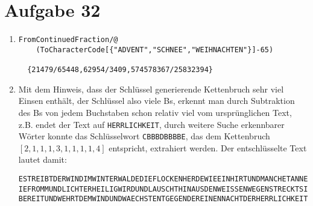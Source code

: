 \section*{Aufgabe 32}
\begin{enumerate}
	\item
	\lstset{language=Mathematica}
	\begin{lstlisting}
FromContinuedFraction/@
	(ToCharacterCode[{"ADVENT","SCHNEE","WEIHNACHTEN"}]-65)

  {21479/65448,62954/3409,574578367/25832394}
	\end{lstlisting}
	\item Mit dem Hinweis, dass der Schlüssel generierende Kettenbruch sehr
	viel Einsen enthält, der Schlüssel also viele Bs, erkennt man durch Subtraktion des
	Bs von jedem Buchstaben schon relativ viel vom ursprünglichen Text,
	z.B. endet der Text auf \verb/HERRLICHKEIT/, durch weitere Suche
	erkennbarer Wörter konnte das Schlüsselwort \verb/CBBBDBBBBE/, das dem
	Kettenbruch $[2,1,1,1,3,1,1,1,1,4]$ entspricht, extrahiert werden. Der
	entschlüsselte Text lautet damit:

\begin{verbatim}
ESTREIBTDERWINDIMWINTERWALDEDIEFLOCKENHERDEWIEEINHIRTUNDMANCHETANNEAHNTWIEBALDES
IEFROMMUNDLICHTERHEILIGWIRDUNDLAUSCHTHINAUSDENWEISSENWEGENSTRECKTSIEDIEZWEIGEHIN
BEREITUNDWEHRTDEMWINDUNDWAECHSTENTGEGENDEREINENNACHTDERHERRLICHKEIT
\end{verbatim}
\end{enumerate}


